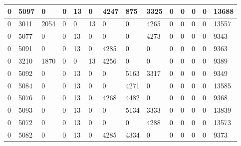 \begin{longtable}{ | l | l | l | l | l | l | l | l | l | l | l | l | l || l | }
	0 & 5097 & 0 & 0 & 13 & 0 & 4247 & 875 & 3325 & 0 & 0 & 0 & 0 & 13688 \\ \hline
	0 & 3011 & 2054 & 0 & 0 & 13 & 0 & 0 & 4265 & 0 & 0 & 0 & 0 & 13557 \\ \hline
	0 & 5077 & 0 & 0 & 13 & 0 & 0 & 0 & 4273 & 0 & 0 & 0 & 0 & 9343 \\ \hline
	0 & 5091 & 0 & 0 & 13 & 0 & 4285 & 0 & 0 & 0 & 0 & 0 & 0 & 9363 \\ \hline
	0 & 3210 & 1870 & 0 & 0 & 13 & 4256 & 0 & 0 & 0 & 0 & 0 & 0 & 9389 \\ \hline
	0 & 5092 & 0 & 0 & 13 & 0 & 0 & 5163 & 3317 & 0 & 0 & 0 & 0 & 9349 \\ \hline
	0 & 5084 & 0 & 0 & 13 & 0 & 0 & 4271 & 0 & 0 & 0 & 0 & 0 & 13585 \\ \hline
	0 & 5076 & 0 & 0 & 13 & 0 & 4268 & 4482 & 0 & 0 & 0 & 0 & 0 & 9368 \\ \hline
	0 & 5093 & 0 & 0 & 13 & 0 & 0 & 5134 & 3333 & 0 & 0 & 0 & 0 & 13839 \\ \hline
	0 & 5072 & 0 & 0 & 13 & 0 & 0 & 0 & 4288 & 0 & 0 & 0 & 0 & 13573 \\ \hline
	0 & 5082 & 0 & 0 & 13 & 0 & 4285 & 4334 & 0 & 0 & 0 & 0 & 0 & 9373 \\ \hline
\end{longtable}

